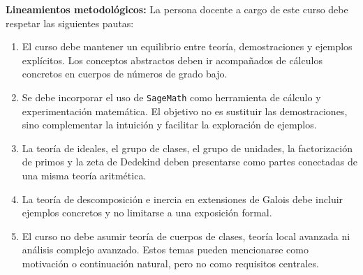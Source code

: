 \begin{refsection}
\noindent \textbf{Lineamientos metodológicos:} La persona docente a cargo de este curso debe respetar las siguientes pautas:
\begin{enumerate}
    \item El curso debe mantener un equilibrio entre teoría, demostraciones y ejemplos explícitos. Los conceptos abstractos deben ir acompañados de cálculos concretos en cuerpos de números de grado bajo.
    \item Se debe incorporar el uso de \texttt{SageMath} como herramienta de cálculo y experimentación matemática. El objetivo no es sustituir las demostraciones, sino complementar la intuición y facilitar la exploración de ejemplos.
    \item La teoría de ideales, el grupo de clases, el grupo de unidades, la factorización de primos y la zeta de Dedekind deben presentarse como partes conectadas de una misma teoría aritmética.
    \item La teoría de descomposición e inercia en extensiones de Galois debe incluir ejemplos concretos y no limitarse a una exposición formal.
    \item El curso no debe asumir teoría de cuerpos de clases, teoría local avanzada ni análisis complejo avanzado. Estos temas pueden mencionarse como motivación o continuación natural, pero no como requisitos centrales.
\end{enumerate}


\end{refsection}
